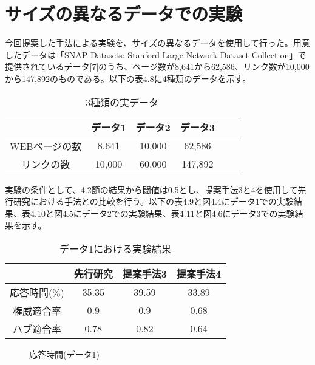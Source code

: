 \documentclass[a4paper,11pt]{jreport}
\begin{document}
\clearpage

\section{サイズの異なるデータでの実験}

今回提案した手法による実験を、サイズの異なるデータを使用して行った。用意したデータは「SNAP Datasets: Stanford Large Network Dataset Collection」で提供されているデータ[7]のうち、ページ数が8,641から62,586、リンク数が10,000から147,892のものである。以下の表4.8に4種類のデータを示す。

\begin{table}[htb]
\begin{center}
\caption{3種類の実データ}
\begin{tabular}{|c||c|c|c|c|c|} \hline
    & データ1 & データ2 & データ3 \\ \hline \hline
    WEBページの数 & 8,641 & 10,000 & 62,586 \\ \hline
    リンクの数 & 10,000 & 60,000 & 147,892 \\  \hline
\end{tabular}
\end{center}
\end{table}

実験の条件として、4.2節の結果から閾値は0.5とし、提案手法3と4を使用して先行研究における手法との比較を行う。以下の表4.9と図4.4にデータ1での実験結果、表4.10と図4.5にデータ2での実験結果、表4.11と図4.6にデータ3での実験結果を示す。

\begin{table}[htb]
\begin{center}
\caption{データ1における実験結果}
\begin{tabular}{|c||c|c|c|} \hline 
    & 先行研究 & 提案手法3 & 提案手法4 \\ \hline \hline
    応答時間(\%) & 35.35 & 39.59 & 33.89 \\  \hline
    権威適合率 & 0.9 & 0.9 & 0.68 \\ \hline
    ハブ適合率 & 0.78 & 0.82 & 0.64 \\ \hline
\end{tabular}
\end{center}
\end{table}

\begin{figure}[htbp]
\begin{center}
\end{center}
\caption{応答時間(データ1)}
\label{figure:sample}
\end{figure}
\end{document}
